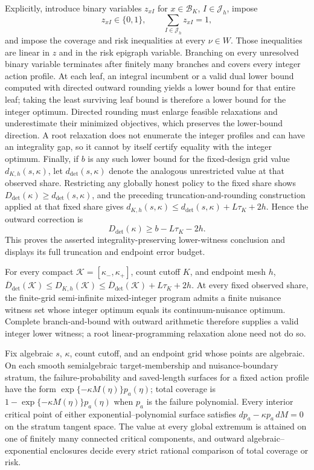 Explicitly, introduce binary variables \(z_{xI}\) for \(x\in\mathcal B_K\), \(I\in\mathcal J_h\), impose
\[
 z_{xI}\in\{0,1\},
 \qquad
 \sum_{I\in\mathcal J_h}z_{xI}=1,
\]
and impose the coverage and risk inequalities at every \(\nu\in W\).  Those inequalities are linear in \(z\) and in the risk epigraph variable.  Branching on every unresolved binary variable terminates after finitely many branches and covers every integer action profile.  At each leaf, an integral incumbent or a valid dual lower bound computed with directed outward rounding yields a lower bound for that entire leaf; taking the least surviving leaf bound is therefore a lower bound for the integer optimum.  Directed rounding must enlarge feasible relaxations and underestimate their minimized objectives, which preserves the lower-bound direction.  A root relaxation does not enumerate the integer profiles and can have an integrality gap, so it cannot by itself certify equality with the integer optimum.  Finally, if \(b\) is any such lower bound for the fixed-design grid value \(d_{K,h}(s,\kappa)\), let \(d_{\mathrm{det}}(s,\kappa)\) denote the analogous unrestricted value at that observed share.  Restricting any globally honest policy to the fixed share shows \(D_{\mathrm{det}}(\kappa)\ge d_{\mathrm{det}}(s,\kappa)\), and the preceding truncation-and-rounding construction applied at that fixed share gives \(d_{K,h}(s,\kappa)\le d_{\mathrm{det}}(s,\kappa)+L\tau_K+2h\).  Hence the outward correction is
\[
 D_{\mathrm{det}}(\kappa)\ge b-L\tau_K-2h.
\]
This proves the asserted integrality-preserving lower-witness conclusion and displays its full truncation and endpoint error budget.

For every compact \(\mathcal K=[\kappa_-,\kappa_+]\), count cutoff \(K\), and endpoint mesh \(h\), \(\overline D_{\mathrm{det}}(\mathcal K)\le D_{K,h}(\mathcal K)\le\overline D_{\mathrm{det}}(\mathcal K)+L\tau_K+2h\). At every fixed observed share, the finite-grid semi-infinite mixed-integer program admits a finite nuisance witness set whose integer optimum equals its continuum-nuisance optimum. Complete branch-and-bound with outward arithmetic therefore supplies a valid integer lower witness; a root linear-programming relaxation alone need not do so.

Fix algebraic \(s\), \(\kappa\), count cutoff, and an endpoint grid whose points are algebraic.  On each smooth semialgebraic target-membership and nuisance-boundary stratum, the failure-probability and saved-length surfaces for a fixed action profile have the form \(\exp\{-\kappa M(\eta)\}p_a(\eta)\); total coverage is \(1-\exp\{-\kappa M(\eta)\}p_a(\eta)\) when \(p_a\) is the failure polynomial.  Every interior critical point of either exponential--polynomial surface satisfies \(dp_a-\kappa p_a\,dM=0\) on the stratum tangent space.  The value at every global extremum is attained on one of finitely many connected critical components, and outward algebraic--exponential enclosures decide every strict rational comparison of total coverage or risk.

